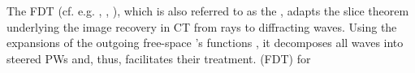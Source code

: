{  %
  The \acs{FDT}
  (cf. e.g.
  \cite[Thm. 8.4]{book:Devaney2012},
  \cite[Thm. 3.1]{book:Natterer2001},
  \cite[Sect. 6.3]{book:Kak2001}%
  ), which is also referred to as
  the , adapts
  the  slice theorem underlying
  the image recovery in
  \acl{CT} from
  rays to
  diffracting waves.
  Using
  the  expansions of
  the outgoing free-space 's functions
  \cite[Sect. 4.1]{book:Devaney2012}, it decomposes
  all waves into
  steered \acp{PW} and, thus, facilitates
  their treatment.
} (\acs{FDT}) for
